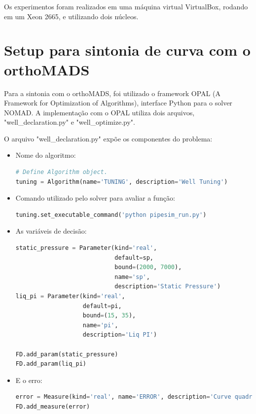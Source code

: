 Os experimentos foram realizados em uma máquina virtual VirtualBox, rodando em um Xeon 2665, e utilizando dois núcleos.

\section{Setup para sintonia de curva com o orthoMADS}
Para a sintonia com o orthoMADS, foi utilizado o framework OPAL (A Framework for Optimization of Algorithms), interface Python para o solver NOMAD.
A implementação com o OPAL utiliza dois arquivos, "well\_declaration.py" e "well\_optimize.py".

O arquivo "well\_declaration.py" expõe os componentes do problema:

\begin{itemize}
\item Nome do algoritmo:
\begin{lstlisting}[language=Python]
# Define Algorithm object.
tuning = Algorithm(name='TUNING', description='Well Tuning')
\end{lstlisting}
\end{itemize}

\begin{itemize}
\item Comando utilizado pelo solver para avaliar a função:
\begin{lstlisting}[language=Python]
tuning.set_executable_command('python pipesim_run.py')
\end{lstlisting}
\end{itemize}


\begin{itemize}
\item As variáveis de decisão:
\begin{lstlisting}[language=Python]
static_pressure = Parameter(kind='real', 
                            default=sp, 
                            bound=(2000, 7000),
                            name='sp', 
                            description='Static Pressure')
liq_pi = Parameter(kind='real', 
                   default=pi, 
                   bound=(15, 35),
                   name='pi', 
                   description='Liq PI')

FD.add_param(static_pressure)
FD.add_param(liq_pi)
\end{lstlisting}
\end{itemize}

\begin{itemize}
\item E o erro:
\begin{lstlisting}[language=Python]
error = Measure(kind='real', name='ERROR', description='Curve quadratic error')
FD.add_measure(error)
\end{lstlisting}
\end{itemize}

